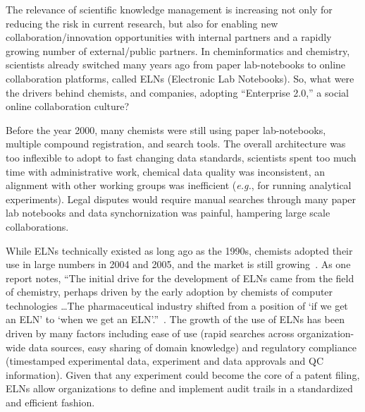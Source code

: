 \documentclass{sig-alternate}
\begin{document}
The relevance of scientific knowledge management is increasing not
only for reducing the risk in current research, but also for enabling
new collaboration/innovation opportunities with internal partners and
a rapidly growing number of external/public partners. In
cheminformatics and chemistry, scientists already switched many years
ago from paper lab-notebooks to online collaboration platforms, called
ELNs (Electronic Lab Notebooks). So, what were the drivers behind
chemists, and companies, adopting ``Enterprise 2.0,'' a social online
collaboration culture?

Before the year 2000, many chemists were still using paper
lab-notebooks, multiple compound registration, and search
tools. The overall architecture was too inflexible to
adopt to fast changing data standards, scientists spent too much time
with administrative work, chemical data quality was inconsistent, an
alignment with other working groups was inefficient (\emph{e.g.}, for
running analytical experiments). Legal disputes would require manual
searches through many paper lab notebooks and data synchornization was
painful, hampering large scale collaborations.


While ELNs technically existed as long ago as the 1990s, chemists
adopted their use in large numbers in 2004 and 2005, and the market is
still growing~\cite{ELNstatus}. As one report notes, ``The initial
drive for the development of ELNs came from the field of chemistry,
perhaps driven by the early adoption by chemists of computer
technologies \ldots The pharmaceutical industry shifted from a
position of `if we get an ELN' to `when we get an
ELN'.''~\cite{ELNstatus}. The growth of the use of ELNs has been
driven by many factors including ease of use (rapid searches across
organization-wide data sources, easy sharing of domain knowledge) and
regulatory compliance (timestamped experimental data, experiment and
data approvals and QC information). Given that any experiment could
become the core of a patent filing, ELNs allow organizations to define
and implement audit trails in a standardized and efficient fashion.
\end{document}

